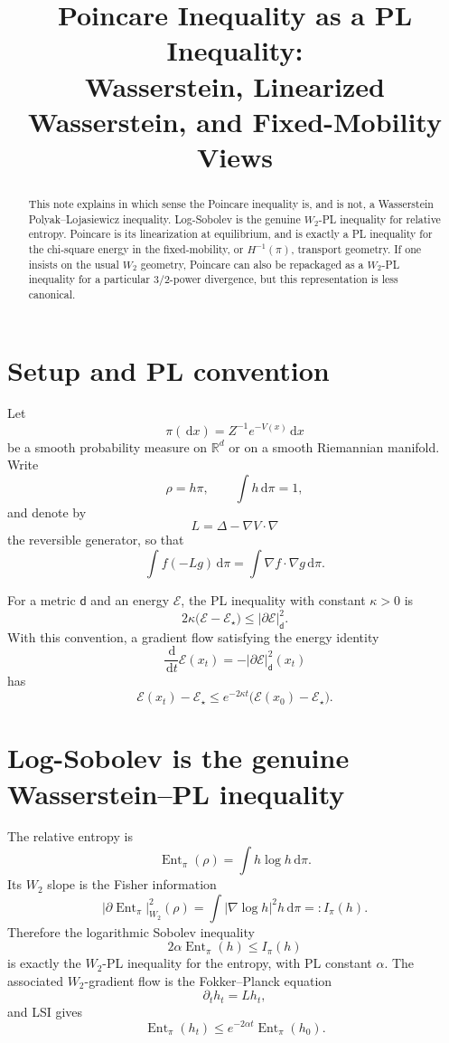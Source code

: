 \documentclass[11pt]{article}
\title{Poincare Inequality as a PL Inequality:\\ Wasserstein, Linearized Wasserstein, and Fixed-Mobility Views}
\author{}
\date{}
\DeclareMathOperator{\Ent}{Ent}
\newcommand{\dd}{\,\mathrm d}
\newcommand{\R}{\mathbb R}
\newcommand{\E}{\mathcal E}
\begin{document}
\maketitle

\begin{abstract}
This note explains in which sense the Poincare inequality is, and is not, a Wasserstein Polyak--Lojasiewicz inequality. Log-Sobolev is the genuine $W_2$-PL inequality for relative entropy. Poincare is its linearization at equilibrium, and is exactly a PL inequality for the chi-square energy in the fixed-mobility, or $H^{-1}(\pi)$, transport geometry. If one insists on the usual $W_2$ geometry, Poincare can also be repackaged as a $W_2$-PL inequality for a particular $3/2$-power divergence, but this representation is less canonical.
\end{abstract}

\section{Setup and PL convention}

Let
\[
        \pi(\dd x)=Z^{-1}e^{-V(x)}\dd x
\]
be a smooth probability measure on $\R^d$ or on a smooth Riemannian manifold. Write
\[
        \rho=h\pi, \qquad \int h\dd\pi=1,
\]
and denote by
\[
        L=\Delta-\nabla V\cdot \nabla
\]
the reversible generator, so that
\[
        \int f(-Lg)\dd\pi=\int \nabla f\cdot \nabla g\dd\pi.
\]

For a metric $\mathsf d$ and an energy $\E$, the PL inequality with constant $\kappa>0$ is
\begin{equation}
        2\kappa\bigl(\E-\E_\star\bigr)
        \le |\partial \E|_{\mathsf d}^2 .
        \tag{PL}
\end{equation}
With this convention, a gradient flow satisfying the energy identity
\[
        \frac{\dd}{\dd t}\E(x_t)=-|\partial \E|_{\mathsf d}^2(x_t)
\]
has
\[
        \E(x_t)-\E_\star
        \le e^{-2\kappa t}\bigl(\E(x_0)-\E_\star\bigr).
\]

\section{Log-Sobolev is the genuine Wasserstein--PL inequality}

The relative entropy is
\[
        \Ent_\pi(\rho)
        =\int h\log h\dd\pi.
\]
Its $W_2$ slope is the Fisher information
\begin{equation}
        |\partial \Ent_\pi|_{W_2}^2(\rho)
        =\int \left|\nabla \log h\right|^2h\dd\pi
        =: I_\pi(h).
\end{equation}
Therefore the logarithmic Sobolev inequality
\begin{equation}
        2\alpha\Ent_\pi(h)\le I_\pi(h)
        \tag{LSI}
\end{equation}
is exactly the $W_2$-PL inequality for the entropy, with PL constant $\alpha$.
The associated $W_2$-gradient flow is the Fokker--Planck equation
\[
        \partial_t h_t=Lh_t,
\]
and LSI gives
\[
        \Ent_\pi(h_t)\le e^{-2\alpha t}\Ent_\pi(h_0).
\]
\end{document}
